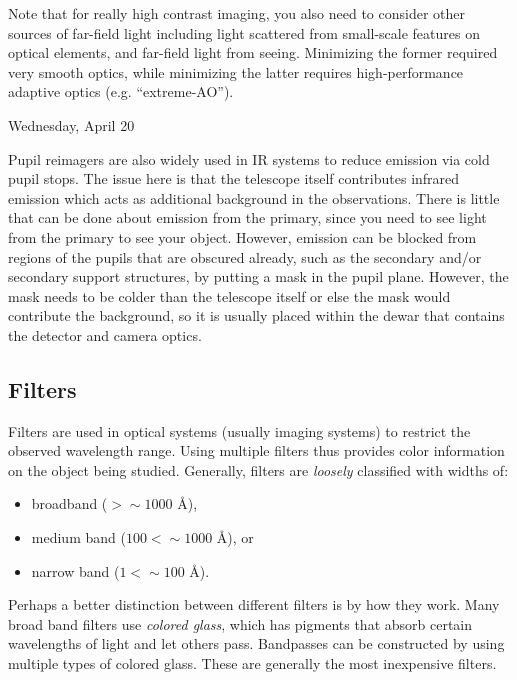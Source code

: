 \documentclass[12pt]{article}
\newcommand{\mynotes}[1]{\textcolor{myBlue}{#1}}
\begin{document}
Note that for really high contrast imaging, you also need to consider
other sources of far-field light including light scattered from
small-scale features on optical elements, and far-field light from
seeing. Minimizing the former required very smooth optics, while
minimizing the latter requires high-performance adaptive optics (e.g.
``extreme-AO'').

\mynotes{Wednesday, April 20}

Pupil reimagers are also widely used in IR systems to reduce emission
via cold pupil stops. The issue here is that the telescope itself
contributes infrared emission which acts as additional background in
the observations. There is little that can be done about emission from the
primary, since you need to see light from the primary to see your
object. However, emission can be blocked from regions of the pupils
that are obscured already, such as the secondary and/or
secondary support structures, by putting a mask in the pupil plane.
However, the mask needs to be colder than the
telescope itself or else the mask would contribute the background, so
it is usually placed within the dewar that contains the detector and
camera optics.

\subsection{Filters}
Filters are used in optical systems (usually imaging systems) to
restrict the observed wavelength range. Using multiple filters thus
provides color information on the object being studied. Generally,
filters are \emph{loosely} classified with widths of:
\begin{itemize}
    \item broadband ($ > \sim 1000$ \AA{}),
    \item medium band ($100 < \sim 1000$ \AA{}), or
    \item narrow band ($1 < \sim 100$ \AA{}).
\end{itemize}

Perhaps a better distinction between different filters is by
how they work.
Many broad band filters use \emph{colored
glass}, which has pigments that absorb certain wavelengths of light
and let others pass. Bandpasses can be constructed by using multiple
types of colored glass. These are generally the most inexpensive
filters.
\end{document}
